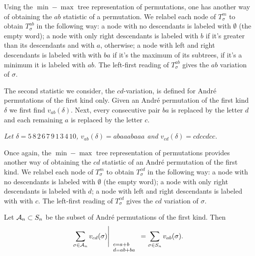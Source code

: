 Using the $\min-\max$ tree representation of permutations, one has another way
of obtaining the $ab$ statistic of a permutation.
We relabel each node of $T_\sigma^m$ to obtain   $T_\sigma^{ab}$ in the following way:
a node with no descendants is labeled with $\emptyset$ (the empty word);
a node with only  right descendants is  labeled with $b$ if it's greater 
than its descendants and with $a$, otherwise;
a node with left and right descendants is labeled with with $ba$
if it's the maximum of its subtrees, if it's a minimum it is labeled with
$ab$. The left-first reading of  $T_\sigma^{ab}$  gives the $ab$
variation of $\sigma$. 


The second statistic we consider, the $cd$-variation, is defined for
Andr\'e permutations of the first kind only.
Given an Andr\'e permutation of the first kind $\delta$ we first
find $v_{ab}(\delta)$.
Next, every consecutive pair $ba$ is replaced by the letter $d$ and
each remaining $a$ is replaced by the letter $c$. 

\begin{example}{\em Let $\delta = 5\, 8\, 2\, 6\, 7\, 9\, 1\, 3\, 4\, 10 $, 
$v_{ab}(\delta) =a b a a a b a a a $ and $v_{cd}(\delta) =c d   c c d
c c $.}
\end{example}

Once again, the $\min-\max$ tree representation of permutations provides
 another way
of obtaining the $cd$ statistic of an Andr\'e permutation of the first kind.
We relabel each node of $T_\sigma^m$  to obtain  $T_\sigma^{cd} $ in the following way:
a node with no descendants is labeled with $\emptyset$ (the empty word);
a node with only  right descendants is  labeled with $d$;
a node with left and right descendants is labeled with with $c$. The left-first reading of  $T_\sigma^{cd}$  gives the $cd$ variation of $\sigma$.



\begin{theorem}[Purtill]
Let ${\cal A}_n\subset S_n$ be the subset of Andr\'e permutations of the
first kind. Then
$$
{ \left. {\sum_{\sigma \in {\cal A}_n}v_{cd}(\sigma)} \right|_{\begin{array}{l}\scriptstyle c = a+b\\[-4pt]\scriptstyle d = ab+ba\end{array}} }=
\sum_{\sigma \in S_n}v_{ab}(\sigma).
$$
\end{theorem}

